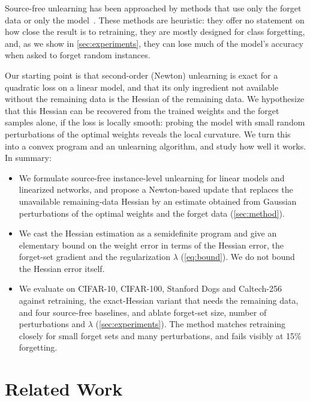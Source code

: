 \documentclass[10pt,twocolumn,letterpaper]{article}
\begin{document}
Source-free unlearning has been approached by methods that use only the forget data or only the model~\cite{tarun2023fast,graves2021amnesiac,chundawat2023zero,foster2024information,cha2024learning}.
These methods are heuristic: they offer no statement on how close the result is to retraining, they are mostly designed for class forgetting, and, as we show in \cref{sec:experiments}, they can lose much of the model's accuracy when asked to forget random instances.

Our starting point is that second-order (Newton) unlearning is exact for a quadratic loss on a linear model, and that its only ingredient not available without the remaining data is the Hessian of the remaining data.
We hypothesize that this Hessian can be recovered from the trained weights and the forget samples alone, if the loss is locally smooth: probing the model with small random perturbations of the optimal weights reveals the local curvature.
We turn this into a convex program and an unlearning algorithm, and study how well it works.
In summary:
\begin{itemize}
    \item We formulate source-free instance-level unlearning for linear models and linearized networks, and propose a Newton-based update that replaces the unavailable remaining-data Hessian by an estimate obtained from Gaussian perturbations of the optimal weights and the forget data (\cref{sec:method}).
    \item We cast the Hessian estimation as a semidefinite program and give an elementary bound on the weight error in terms of the Hessian error, the forget-set gradient and the regularization $\lambda$ (\cref{eq:bound}). We do not bound the Hessian error itself.
    \item We evaluate on CIFAR-10, CIFAR-100, Stanford Dogs and Caltech-256 against retraining, the exact-Hessian variant that needs the remaining data, and four source-free baselines, and ablate forget-set size, number of perturbations and $\lambda$ (\cref{sec:experiments}). The method matches retraining closely for small forget sets and many perturbations, and fails visibly at 15\% forgetting.
\end{itemize}

\section{Related Work}
\label{sec:related_work}
\end{document}
